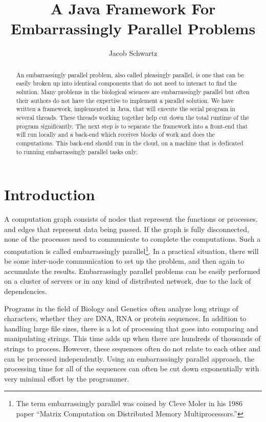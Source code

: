 \documentclass[12pt]{article}
\begin{document}
\title{A Java Framework For Embarrassingly Parallel Problems}
\author{Jacob Schwartz}
\maketitle

\begin{abstract}
An embarrassingly parallel problem, also called pleasingly parallel, is one that
can be easily broken up into identical components that do not need to interact
to find the solution. Many problems in the biological sciences are 
embarrassingly parallel but often their authors do not have the expertise to
implement a parallel solution. We have written a framework, implemented in Java,
that will execute the serial program in several threads. These threads working
together help cut down the total runtime of the program significantly. The next
step is to separate the framework into a front-end that will run locally and a
back-end which receives blocks of work and does the computations. This back-end
should run in the cloud, on a machine that is dedicated to running
embarrassingly parallel tasks only.
\end{abstract}

\section{Introduction}

A computation graph consists of nodes that represent the functions or processes.
and edges that represent data being passed. If the graph is fully disconnected,
none of the processes need to communicate to complete the computations. Such a
computation is called embarrassingly parallel\footnote{The term embarrassingly
parallel was coined by Cleve Moler in his 1986 paper ``Matrix Computation on
Distributed Memory Multiprocessors.''}. In a practical situation, there will be
some inter-node communication to set up the problem, and then again to
accumulate the results.  Embarrassingly parallel problems can be easily
performed on a cluster of servers or in any kind of distributed network, due to
the lack of dependencies. 

Programs in the field of Biology and Genetics often analyze long strings of
characters, whether they are DNA, RNA or protein sequences. In addition to
handling large file sizes, there is a lot of processing that goes into comparing
and manipulating strings. This time adds up when there are hundreds of thousands
of strings to process. However, these sequences often do not relate to each
other and can be processed independently. Using an embarrassingly parallel
approach, the processing time for all of the sequences can often be cut down
exponentially with very minimal effort by the programmer.
\end{document}
